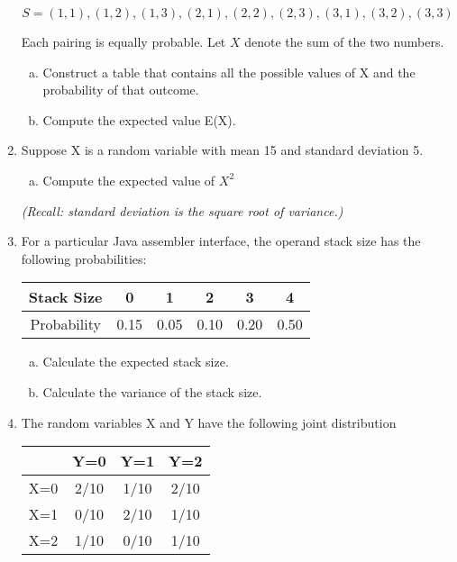 \documentclass[]{article}
\begin{document}
\begin{enumerate}
\[S = {(1, 1), (1, 2), (1, 3), (2, 1), (2, 2), (2, 3), (3, 1), (3, 2), (3, 3)}\]

Each pairing is equally probable. Let $X$ denote the sum of the two numbers. 

\begin{enumerate}[(a)]
\item Construct a table that contains all the possible values of X and the probability of that outcome.

\item Compute the expected value E(X).
\end{enumerate}


\item 

Suppose X is a random variable with mean 15 and standard deviation 5.

\begin{enumerate}[(a)]
\item Compute the expected value of $X^2$ 
\end{enumerate}
\textit{(Recall: standard deviation is the square root of variance.)}
    
    \item 
For a particular Java assembler interface, the operand stack size has the
following probabilities:

\begin{center}
\begin{tabular}{|c||c|c|c|c|c|}
\hline
Stack Size  & 0 & 1 & 2 & 3 & 4 \\ \hline
Probability & 0.15 & 0.05 & 0.10 &0.20 &0.50\\
\hline
\end{tabular}
\end{center}


\begin{enumerate}[(a)]

\item Calculate the expected stack size.
\item Calculate the variance of the stack size.

\end{enumerate}

\item 
The random variables X and Y have the following joint distribution
\begin{center}
\begin{tabular}{|c||c|c|c|} \hline
	& Y=0	& Y=1 & 	 Y=2 \\ \hline \hline
X=0	& 2/10	& 1/10	& 2/10 \\ \hline
X=1	& 0/10	& 2/10	& 1/10 \\ \hline
X=2	& 1/10	& 0/10	& 1/10 \\ \hline
 

\end{tabular}
\end{center}
\end{enumerate}
\end{document}
